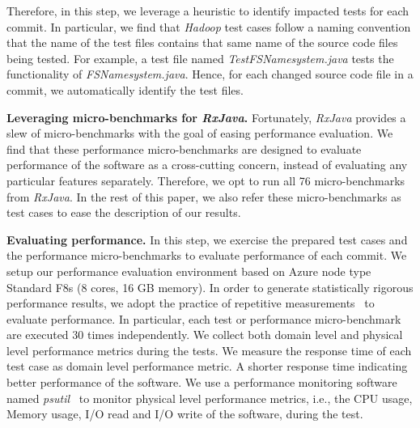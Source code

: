 Therefore, in this step, we leverage a heuristic to identify impacted tests for each commit. In particular, we find that \emph{Hadoop} test cases follow a naming convention that the name of the test files contains that same name of the source code files being tested. For example, a test file named \emph{TestFSNamesystem.java} tests the functionality of \emph{FSNamesystem.java}. Hence, for each changed source code file in a commit, we automatically identify the test files. 


\textbf{Leveraging micro-benchmarks for \emph{RxJava}. }Fortunately, \emph{RxJava} provides a slew of micro-benchmarks with the goal of easing performance evaluation. We find that these performance micro-benchmarks are designed to evaluate performance of the software as a cross-cutting concern, instead of evaluating any particular features separately. Therefore, we opt to run all 76 micro-benchmarks from \emph{RxJava}. In the rest of this paper, we also refer these micro-benchmarks as test cases to ease the description of our results.

\textbf{Evaluating performance.}
In this step, we exercise the prepared test cases and the performance micro-benchmarks to evaluate performance of each commit. We setup our performance evaluation environment based on Azure node type Standard F8s (8 cores, 16 GB memory). In order to generate statistically rigorous performance results, we adopt the practice of repetitive measurements~\cite{peterfse} to evaluate performance. 
In particular, each test or performance micro-benchmark are executed 30 times independently. We collect both domain level and physical level performance metrics during the tests. We measure the response time of each test case as domain level performance metric. A shorter response time indicating better performance of the software. We use a performance monitoring software named \emph{psutil}~\cite{psutil} to monitor physical level performance metrics, i.e., the CPU usage, Memory usage, I/O read and I/O write of the software, during the test.

